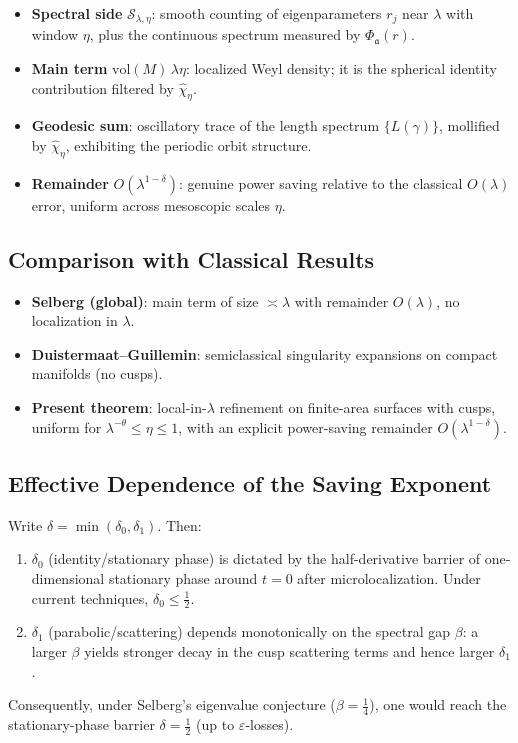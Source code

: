 \begin{itemize}
  \item \textbf{Spectral side} \(\mathcal{S}_{\lambda,\eta}\):
  smooth counting of eigenparameters \(r_j\) near \(\lambda\) with window \(\eta\), plus the continuous spectrum measured by \(\Phi_{\mathfrak{a}}(r)\).
  \item \textbf{Main term} \(\mathrm{vol}(M)\,\lambda\eta\):
  localized Weyl density; it is the spherical identity contribution filtered by \(\widehat{\chi}_\eta\).
  \item \textbf{Geodesic sum}:
  oscillatory trace of the length spectrum \(\{L(\gamma)\}\), mollified by \(\widehat{\chi}_\eta\), exhibiting the periodic orbit structure.
  \item \textbf{Remainder} \(O(\lambda^{1-\delta})\):
  genuine power saving relative to the classical \(O(\lambda)\) error, uniform across mesoscopic scales \(\eta\).
\end{itemize}

\subsection{Comparison with Classical Results} \label{subsec:7.2-classical}

\begin{itemize}
  \item \textbf{Selberg (global)}: main term of size \(\asymp \lambda\) with remainder \(O(\lambda)\), no localization in \(\lambda\).
  \item \textbf{Duistermaat--Guillemin}: semiclassical singularity expansions on compact manifolds (no cusps).
  \item \textbf{Present theorem}: local-in-\(\lambda\) refinement on finite-area surfaces with cusps, uniform for
    \(\lambda^{-\theta}\le \eta\le 1\), with an explicit power-saving remainder \(O(\lambda^{1-\delta})\).
\end{itemize}

\subsection{Effective Dependence of the Saving Exponent} \label{subsec:7.2-delta}

Write \(\delta=\min(\delta_0,\delta_1)\). Then:
\begin{enumerate}
  \item \(\delta_0\) (identity/stationary phase) is dictated by the half-derivative barrier of one-dimensional stationary phase around \(t=0\) after microlocalization. Under current techniques, \(\delta_0\le \tfrac12\).
  \item \(\delta_1\) (parabolic/scattering) depends monotonically on the spectral gap \(\beta\): a larger \(\beta\) yields stronger decay in the cusp scattering terms and hence larger \(\delta_1\).
\end{enumerate}
Consequently, under Selberg’s eigenvalue conjecture (\(\beta=\tfrac14\)), one would reach the stationary-phase barrier \(\delta=\tfrac12\) (up to \(\varepsilon\)-losses).

